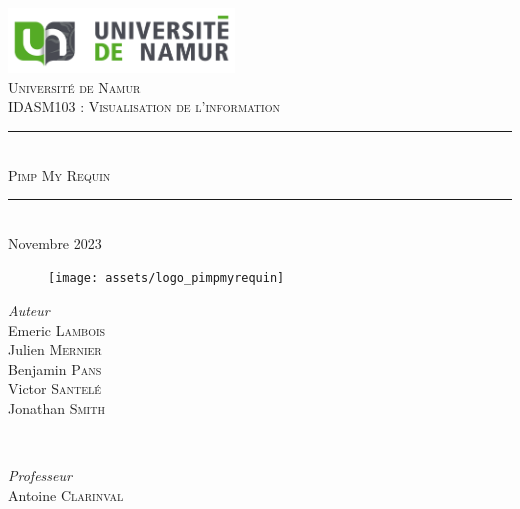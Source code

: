 \documentclass{article}
\begin{document}
\begin{titlepage}
\newcommand{\HRule}{\rule{\linewidth}{0.5mm}} 
\center

\includegraphics[width=6cm]{assets/logo_unamur}
\\[2cm]

\textsc{\LARGE Université de Namur}
\\[2cm]

\textsc{\Large IDASM103 : Visualisation de l'information}
\\[0.2cm]

\HRule
\\[0.4cm]
\textsc{\huge Pimp My Requin}
\\[0.2cm]
\HRule
\\[0.4cm]
{\large Novembre 2023}
\\[1.5cm]

\begin{figure}[h!]
	\centering
	\texttt{[image: assets/logo\_pimpmyrequin]}
	\\[1.5cm]
\end{figure}

\begin{minipage}{0.5\textwidth}
	\begin{flushleft} 
		\emph{Auteur}
		\\
		Emeric \textsc{Lambois}
		\\
		Julien \textsc{Mernier}
		\\
		Benjamin \textsc{Pans}
		\\
		Victor \textsc{Santelé}
		\\
		Jonathan \textsc{Smith}
		\\
	\end{flushleft}
\end{minipage}
~
\begin{minipage}{0.4\textwidth}
	\begin{flushright}
		\emph{Professeur}
		\\
		Antoine \textsc{Clarinval}
		\\
	\end{flushright}
\end{minipage}

\end{titlepage}

\newpage

\tableofcontents
\end{document}
